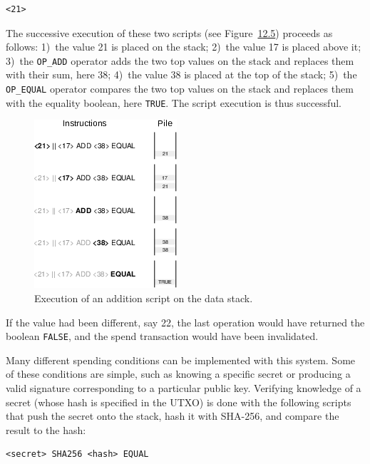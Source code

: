 \documentclass[
  a5paper,
  smalldemyvopaper,10pt,twoside,onecolumn,openright,extrafontsizes,hidelinks]{memoir}
\begin{document}
\begin{verbatim}
<21>
\end{verbatim}

The successive execution of these two scripts (see
Figure~\hyperref[fig:bitcoin-stack]{12.5}) proceeds as follows: 1)~the
value 21 is placed on the stack; 2)~the value 17 is placed above it;
3)~the \texttt{OP\_ADD} operator adds the two top values on the stack
and replaces them with their sum, here 38; 4)~the value 38 is placed at
the top of the stack; 5)~the \texttt{OP\_EQUAL} operator compares the
two top values on the stack and replaces them with the equality boolean,
here \texttt{TRUE}. The script execution is thus successful.

\begin{figure}

{\centering \includegraphics{chapters/img/bitcoin-stack-example.png}

}

\caption{Execution of an addition script on the data stack.}

\end{figure}%

If the value had been different, say 22, the last operation would have
returned the boolean \texttt{FALSE}, and the spend transaction would
have been invalidated.

Many different spending conditions can be implemented with this system.
Some of these conditions are simple, such as knowing a specific secret
or producing a valid signature corresponding to a particular public key.
Verifying knowledge of a secret (whose hash is specified in the UTXO) is
done with the following scripts that push the secret onto the stack,
hash it with SHA-256, and compare the result to the hash:

\begin{verbatim}
<secret> SHA256 <hash> EQUAL
\end{verbatim}
\end{document}

